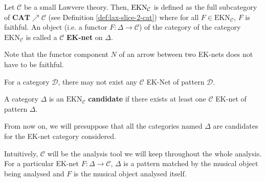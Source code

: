\begin{defn}[EK-nets]
    Let $\mathcal{C}$ be a small Lawvere theory. Then, $\bf \text{EKN}_\mathcal{C}$ \label{nomencl:EKN} is defined as the full subcategory of $\textbf{CAT}\nearrow \mathcal{C}$ (see Definition \ref{def:lax-slice-2-cat}) where for all $F\in \text{EKN}_\mathcal{C}$, $F$ is faithful. An object (i.e. a functor $F : \Delta \rightarrow \mathcal{C}$) of the category of the category $\text{EKN}_\mathcal{C}$ is called a $\mathcal{C}$ \textbf{EK-net} on  $\Delta$.
\end{defn}

\begin{rem}
    Note that the functor component $N$ of an arrow between two EK-nets does not have to be faithful.
\end{rem}

For a category $\mathcal{D}$, there may not exist any $\mathcal{C}$ EK-Net of pattern $\mathcal{D}$.
\begin{defn}[EK candidate]
    A category $\Delta$ is an $\text{EKN}_{\mathcal{C}}$ \textbf{candidate} if there exists at least one $\mathcal{C}$ EK-net of pattern $\Delta$.
\end{defn}

\begin{note}
    From now on, we will presuppose that all the categories named $\Delta$ are candidates for the EK-net category considered.
\end{note}

Intuitively, $\mathcal{C}$ will be the analysis tool we will keep throughout the whole analysis. For a particular EK-net $F : \Delta \rightarrow \mathcal{C}$, $\Delta$ is a pattern matched by the musical object being analysed and $F$ is the musical object analysed itself.







